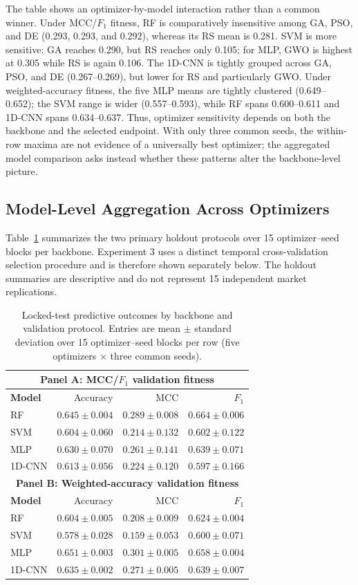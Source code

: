 The table shows an optimizer-by-model interaction rather than a common winner. Under MCC/$F_1$ fitness, RF is comparatively insensitive among GA, PSO, and DE (0.293, 0.293, and 0.292), whereas its RS mean is 0.281. SVM is more sensitive: GA reaches 0.290, but RS reaches only 0.105; for MLP, GWO is highest at 0.305 while RS is again 0.106. The 1D-CNN is tightly grouped across GA, PSO, and DE (0.267--0.269), but lower for RS and particularly GWO. Under weighted-accuracy fitness, the five MLP means are tightly clustered (0.649--0.652); the SVM range is wider (0.557--0.593), while RF spans 0.600--0.611 and 1D-CNN spans 0.634--0.637. Thus, optimizer sensitivity depends on both the backbone and the selected endpoint. With only three common seeds, the within-row maxima are not evidence of a universally best optimizer; the aggregated model comparison asks instead whether these patterns alter the backbone-level picture.

\subsection{Model-Level Aggregation Across Optimizers}

Table~\ref{tab:predictive_summary} summarizes the two primary holdout protocols over 15 optimizer--seed blocks per backbone. Experiment 3 uses a distinct temporal cross-validation selection procedure and is therefore shown separately below. The holdout summaries are descriptive and do not represent 15 independent market replications.

\begin{table}[!htbp]
\centering
\caption{Locked-test predictive outcomes by backbone and validation protocol. Entries are mean $\pm$ standard deviation over 15 optimizer--seed blocks per row (five optimizers $\times$ three common seeds).}
\label{tab:predictive_summary}
\manuscripttablestyle
\begin{tabular}{lrrr}\toprule
\multicolumn{4}{c}{\textbf{Panel A: MCC/$F_1$ validation fitness}}\\\midrule
\textbf{Model} & Accuracy & MCC & $F_1$\\\midrule
RF & $0.645\pm0.004$ & $0.289\pm0.008$ & $0.664\pm0.006$\\
SVM & $0.604\pm0.060$ & $0.214\pm0.132$ & $0.602\pm0.122$\\
MLP & $0.630\pm0.070$ & $0.261\pm0.141$ & $0.639\pm0.071$\\
1D-CNN & $0.613\pm0.056$ & $0.224\pm0.120$ & $0.597\pm0.166$\\\midrule
\multicolumn{4}{c}{\textbf{Panel B: Weighted-accuracy validation fitness}}\\\midrule
\textbf{Model} & Accuracy & MCC & $F_1$\\\midrule
RF & $0.604\pm0.005$ & $0.208\pm0.009$ & $0.624\pm0.004$\\
SVM & $0.578\pm0.028$ & $0.159\pm0.053$ & $0.600\pm0.071$\\
MLP & $0.651\pm0.003$ & $0.301\pm0.005$ & $0.658\pm0.004$\\
1D-CNN & $0.635\pm0.002$ & $0.271\pm0.005$ & $0.639\pm0.007$\\\bottomrule
\end{tabular}
\end{table}

